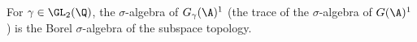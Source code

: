 For $\gamma\in\GL_2(\Q)$, the $\sigma$-algebra of $G_\gamma(\A)^1$ (the trace of the $\sigma$-algebra of $G(\A)^1$) is the Borel
$\sigma$-algebra of the subspace topology.
